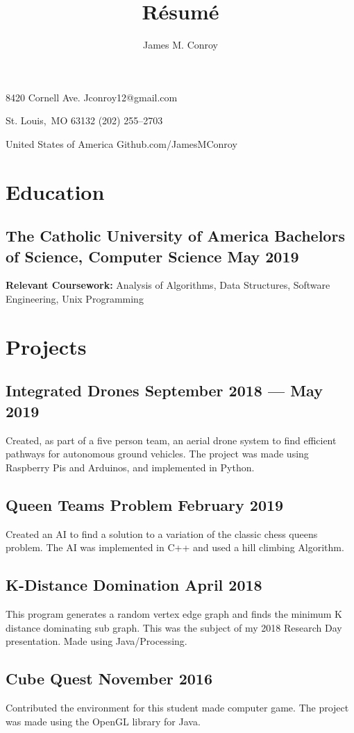 \documentclass[12pt, letterpaper]{article}
\author{James M. Conroy}
\title{R\'esum\'e}
\makeatletter
\renewcommand{\maketitle} {
	\begin{center}
	{\Large\bfseries
	\theauthor}

	\end{center}

	\setlength{\parindent}{0pt}
	\setlength{\parskip}{0em}
	8420 Cornell Ave.
	\hfill Jconroy12@gmail.com

	St. Louis,\ MO 63132
	\hfill (202) 255--2703

	United States of America
	\hfill Github.com/JamesMConroy
}
\makeatother
\begin{document}
\maketitle
\section{Education}
\subsection{The Catholic University of America \hspace {20pt} Bachelors of Science, Computer Science \hfill  May 2019 }

\noindent
\textbf{Relevant Coursework:}
Analysis of Algorithms,
Data Structures,
Software Engineering,
Unix Programming

\section{Projects}
\subsection{Integrated Drones \hfill September 2018 --- May 2019}
\justify
Created, as part of a five person team, an aerial drone system to find efficient pathways for autonomous ground vehicles.
The project was made using Raspberry Pis and Arduinos, and implemented in Python.

\subsection{Queen Teams Problem \hfill February 2019}
\justify
Created an AI to find a solution to a variation of the classic chess queens problem.
The AI was implemented in C++ and used a hill climbing Algorithm.

\subsection{K-Distance Domination \hfill April 2018}
\justify
This program generates a random vertex edge graph and finds the minimum K distance dominating sub graph.
This was the subject of my 2018 Research Day presentation.
Made using Java/Processing.

\subsection{Cube Quest \hfill November 2016}
\justify
Contributed the environment for this student made computer game.
The project was made using the OpenGL library for Java.
\end{document}
